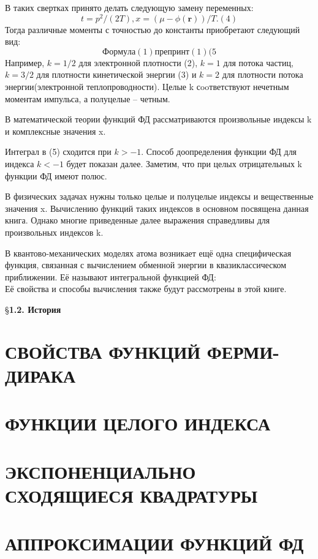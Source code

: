\documentclass[11pt,a4paper]{book}
\begin{document}
В таких свертках принято делать следующую замену переменных:
\begin{equation}
t = p^2 / (2T), x =  (\mu - \phi(\textbf{r})) / T.   (4)
\end{equation}
Тогда различные моменты с точностью до константы приобретают следующий вид:
\begin{equation}
Формула (1) препринт(1) (5
\end{equation}
Например, $k = 1/2$ для электронной плотности (2), $k = 1$ для потока частиц, $k = 3/2$ для плотности кинетической энергии (3) и $k = 2$ для плотности потока энергии(электронной теплопроводности). Целые k сooтветствуют нечетным моментам импульса, а полуцелые – четным.

В математической теории функций ФД рассматриваются произвольные индексы k и комплексные значения x. 		

Интеграл в (5) сходится при $k > -1$. Способ доопределения функции ФД для индекса $k < -1$ будет показан далее. Заметим, что при целых отрицательных k функции ФД имеют полюс.

В физических задачах нужны только целые и полуцелые индексы и вещественные значения x. Вычислению функций таких индексов в основном посвящена данная книга. Однако многие приведенные далее выражения справедливы для произвольных индексов k.

В квантово-механических моделях атома возникает ещё одна
специфическая функция, связанная с вычислением обменной энергии в
квазиклассическом приближении. Её называют интегральной функцией ФД:
\begin{equation}
\end{equation}
Её свойства и способы вычисления также будут рассмотрены в этой книге. 

\S \textbf{1.2. История}





\chapter{СВОЙСТВА ФУНКЦИЙ ФЕРМИ-ДИРАКА}



\chapter{ФУНКЦИИ ЦЕЛОГО ИНДЕКСА}



\chapter{ЭКСПОНЕНЦИАЛЬНО СХОДЯЩИЕСЯ КВАДРАТУРЫ}



\chapter{АППРОКСИМАЦИИ ФУНКЦИЙ ФД}
\end{document}
